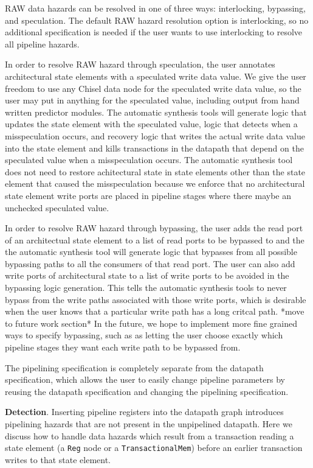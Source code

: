 RAW data hazards can be resolved in one of three ways: interlocking,
bypassing, and speculation. The default RAW hazard resolution option
is interlocking, so no additional specification is needed if the user
wants to use interlocking to resolve all pipeline hazards.

In order to resolve RAW hazard through speculation, the user annotates
architectural state elements with a speculated write data value. We
give the user freedom to use any Chisel data node for the speculated
write data value, so the user may put in anything for the speculated
value, including output from hand written predictor modules. The
automatic synthesis tools will generate logic that updates the state
element with the speculated value, logic that detects when a
misspeculation occurs, and recovery logic that writes the actual write
data value into the state element and kills transactions in the
datapath that depend on the speculated value when a misspeculation
occurs. The automatic synthesis tool does not need to restore
achitectural state in state elements other than the state element that
caused the misspeculation because we enforce that no architectural
state element write ports are placed in pipeline stages where there
maybe an unchecked speculated value. 

In order to resolve RAW hazard through bypassing, the user adds the
read port of an architectual state element to a list of read ports to
be bypassed to and the the automatic synthesis tool will generate logic
that bypasses from all possible bypassing paths to all the consumers
of that read port. The user can also
add write ports of architectural state to a list of write ports to be avoided in the bypassing logic generation. This tells the automatic synthesis tools to never
bypass from the write paths associated with those write ports, which
is desirable when the user knows that a particular write path has a
long critcal path. *move to future work section* In the future, we
hope to implement more fine grained ways to specify bypassing, such as
as letting the user choose exactly which pipeline stages they want
each write path to be bypassed from.

The pipelining specification is completely separate from the datapath
specification, which allows the user to easily change pipeline
parameters by reusing the datapath specification and changing the
pipelining specification.

{\bf Detection}. Inserting pipeline registers into the datapath
graph introduces pipelining hazards that are not present in the
unpipelined datapath. Here we discuss how to handle data hazards which
result from a transaction reading a state element (a {\tt Reg} node or a
{\tt TransactionalMem}) before an earlier transaction writes to that state
element. 

